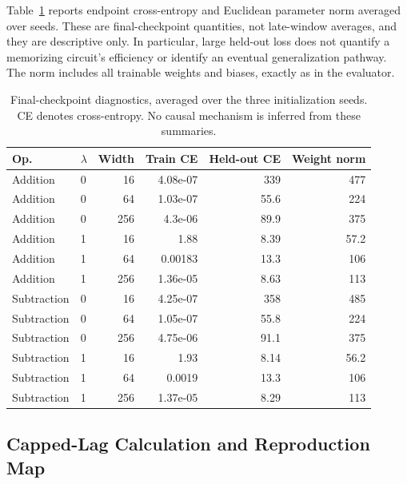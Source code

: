 \documentclass{article}
\begin{document}
Table~\ref{tab:diagnostics} reports endpoint cross-entropy and Euclidean parameter norm averaged over seeds. These are final-checkpoint quantities, not late-window averages, and they are descriptive only. In particular, large held-out loss does not quantify a memorizing circuit's efficiency or identify an eventual generalization pathway. The norm includes all trainable weights and biases, exactly as in the evaluator.
\begin{table}[h]
\centering
\small
\begin{tabular}{llrrrr}
\toprule
Op. & $\lambda$ & Width & Train CE & Held-out CE & Weight norm \\
\midrule
Addition & 0 & 16 & 4.08e-07 & 339 & 477 \\
Addition & 0 & 64 & 1.03e-07 & 55.6 & 224 \\
Addition & 0 & 256 & 4.3e-06 & 89.9 & 375 \\
Addition & 1 & 16 & 1.88 & 8.39 & 57.2 \\
Addition & 1 & 64 & 0.00183 & 13.3 & 106 \\
Addition & 1 & 256 & 1.36e-05 & 8.63 & 113 \\
Subtraction & 0 & 16 & 4.25e-07 & 358 & 485 \\
Subtraction & 0 & 64 & 1.05e-07 & 55.8 & 224 \\
Subtraction & 0 & 256 & 4.75e-06 & 91.1 & 375 \\
Subtraction & 1 & 16 & 1.93 & 8.14 & 56.2 \\
Subtraction & 1 & 64 & 0.0019 & 13.3 & 106 \\
Subtraction & 1 & 256 & 1.37e-05 & 8.29 & 113 \\
\bottomrule
\end{tabular}
\caption{Final-checkpoint diagnostics, averaged over the three initialization seeds. CE denotes cross-entropy. No causal mechanism is inferred from these summaries.}
\label{tab:diagnostics}
\end{table}

\subsection{Capped-Lag Calculation and Reproduction Map}
\end{document}
